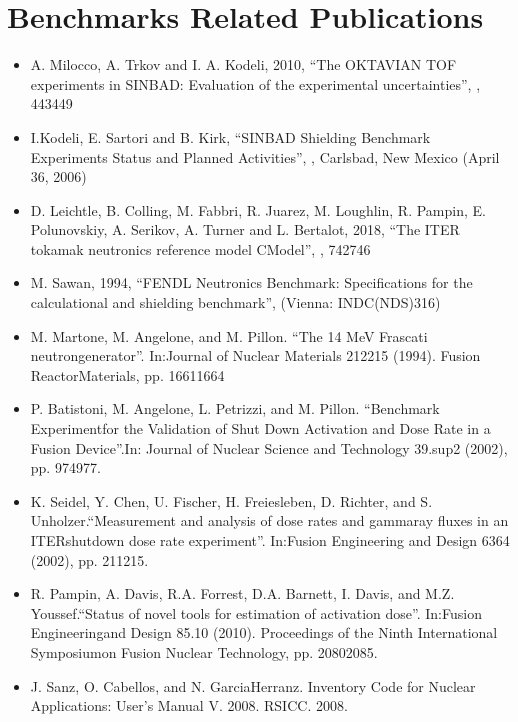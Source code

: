 \documentclass[letterpaper,10pt,english]{sphinxmanual}
\begin{document}
\section{Benchmarks Related Publications}
\label{\detokenize{publications:benchmarks-related-publications}}\begin{itemize}
\item {} 
A. Milocco, A. Trkov and I. A. Kodeli, 2010, “The OKTAVIAN TOF experiments in SINBAD: Evaluation of the
experimental uncertainties”, ,  443\sphinxhyphen{}449

\item {} 
I.Kodeli, E. Sartori and B. Kirk, “SINBAD \sphinxhyphen{} Shielding Benchmark Experiments \sphinxhyphen{} Status and Planned Activities”,
,
Carlsbad, New Mexico (April 3\sphinxhyphen{}6, 2006)

\item {} 
D. Leichtle, B. Colling, M. Fabbri, R. Juarez, M. Loughlin,
R. Pampin, E. Polunovskiy, A. Serikov, A. Turner and L. Bertalot, 2018,
“The ITER tokamak neutronics reference model C\sphinxhyphen{}Model”,
,  742\sphinxhyphen{}746

\item {} 
M. Sawan, 1994,  “FENDL Neutronics Benchmark: Specifications for the calculational and shielding benchmark”,
(Vienna: INDC(NDS)\sphinxhyphen{}316)

\item {} 
M. Martone, M. Angelone, and M. Pillon. “The 14 MeV Frascati neutrongenerator”.
In:Journal of Nuclear Materials 212\sphinxhyphen{}215 (1994). Fusion ReactorMaterials, pp. 1661\textendash{}1664

\item {} 
P. Batistoni, M. Angelone, L. Petrizzi, and M. Pillon. “Benchmark Experimentfor the
Validation of Shut Down Activation and Dose Rate in a Fusion Device”.In: Journal of Nuclear
Science and Technology 39.sup2 (2002), pp. 974\textendash{}977.

\item {} 
K. Seidel, Y. Chen, U. Fischer, H. Freiesleben, D. Richter, and S. Unholzer.“Measurement
and analysis of dose rates and gamma\sphinxhyphen{}ray fluxes in an ITERshut\sphinxhyphen{}down dose rate experiment”.
In:Fusion Engineering and Design 63\sphinxhyphen{}64 (2002), pp. 211\textendash{}215.

\item {} 
R. Pampin, A. Davis, R.A. Forrest, D.A. Barnett, I. Davis, and M.Z. Youssef.“Status of novel
tools for estimation of activation dose”. In:Fusion Engineeringand Design 85.10 (2010).
Proceedings of the Ninth International Symposiumon Fusion Nuclear Technology, pp. 2080\textendash{}2085.

\item {} 
J. Sanz, O. Cabellos, and N. Garcia\sphinxhyphen{}Herranz. Inventory Code for Nuclear Applications:
User’s Manual V. 2008. RSICC. 2008.

\end{itemize}
\end{document}
